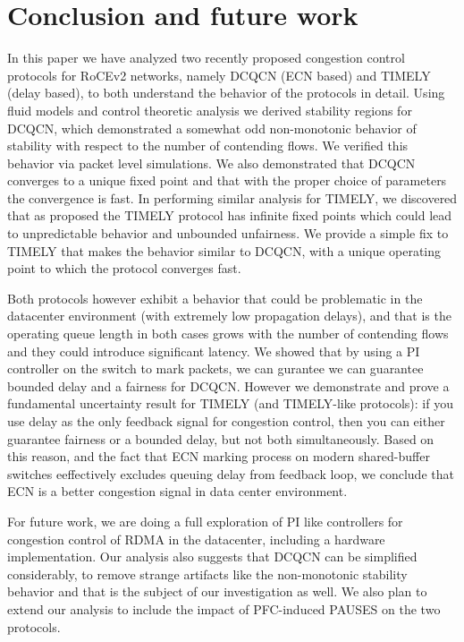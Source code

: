 \section{Conclusion and future work}
In this paper we have analyzed two recently proposed congestion control
protocols for RoCEv2 networks, namely DCQCN (ECN based) and TIMELY (delay
based), to both understand the behavior of the protocols in detail.
Using fluid models and control theoretic analysis
we derived stability regions for DCQCN, which demonstrated a somewhat odd
non-monotonic behavior of stability with respect to the number of contending
flows. We verified this behavior via packet level simulations. We also
demonstrated that DCQCN converges to a unique fixed point and that with the
proper choice of parameters the convergence is fast. In performing similar
analysis for TIMELY, we discovered that as proposed the TIMELY protocol has
infinite fixed points which could lead to unpredictable behavior and unbounded
unfairness. We provide a simple fix to TIMELY that makes the behavior similar to
DCQCN, with a unique operating point to which the protocol converges fast. 

Both protocols however exhibit a behavior that could be problematic in the
datacenter environment (with extremely low propagation delays), and that is the
operating queue length in both cases grows with the number of contending flows
and they could introduce significant latency. We showed that by using a PI
controller on the switch to mark packets, we can gurantee  we can guarantee
bounded delay and a fairness for DCQCN.  However we demonstrate and prove a
fundamental uncertainty result for TIMELY (and TIMELY-like protocols): if you
use delay as the only feedback signal for congestion control, then you can
either guarantee fairness or a bounded delay, but not both simultaneously. Based
on this reason, and the fact that ECN marking process on modern shared-buffer
switches eeffectively excludes queuing delay from feedback loop, we conclude
that ECN is a better congestion signal in data center environment. 

For future work, we are doing a full exploration of PI like controllers for
congestion control of RDMA in the datacenter, including a hardware
implementation. Our analysis also suggests that DCQCN can be simplified
considerably, to remove strange artifacts like the non-monotonic stability
behavior and that is the subject of our investigation as well.  We also plan to
extend our analysis to include the impact of PFC-induced PAUSES on the two
protocols.


